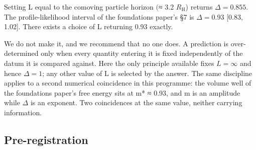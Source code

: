 \documentclass[aps,prd,preprint,nofootinbib,superscriptaddress]{revtex4-2}
\begin{document}
Setting L equal to the comoving particle horizon \((\)≈ 3.2
\(R_{\mathrm{H}}\)) returns \(\Delta  = 0.855\). The profile-likelihood
interval of the foundations paper's §7 is \(\Delta  = 0.93\) {[}0.83,
1.02{]}. There exists a choice of L returning 0.93 exactly.

We do not make it, and we recommend that no one does. A prediction is
over-determined only when every quantity entering it is fixed
independently of the datum it is compared against. Here the only
principle available fixes \(L = \infty\) and hence \(\Delta  = 1\); any
other value of L is selected by the answer. The same discipline applies
to a second numerical coincidence in this programme: the volume well of
the foundations paper's free energy sits at m* ≈ 0.93, and m is an
amplitude while \(\Delta\) is an exponent. Two coincidences at the same
value, neither carrying information.

\subsection{Pre-registration}\label{sec-5-5}
\end{document}
